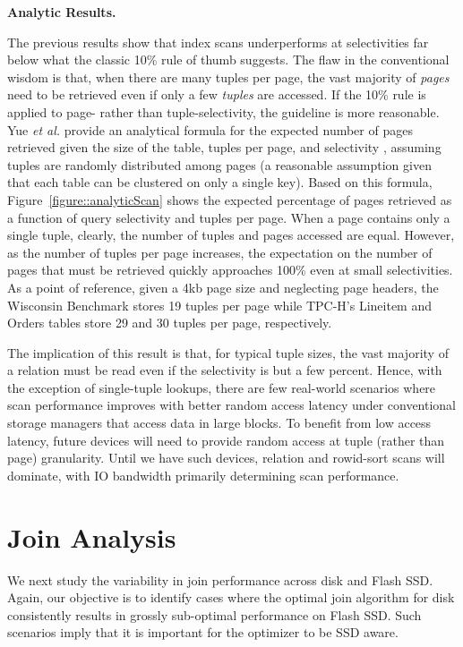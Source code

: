 \textbf{Analytic Results.}

The previous results show that index scans underperforms at selectivities far below what the classic 10\% rule of thumb suggests. 
The flaw in the conventional wisdom is that, when there are many tuples per page, the vast majority of \emph{pages} need to be retrieved even if only a few \emph{tuples} are accessed.
If the 10\% rule is applied to page- rather than tuple-selectivity, the guideline is more reasonable.
Yue \emph{et al.} provide an analytical formula for the expected number of pages retrieved given the size of the table, tuples per page, and selectivity \cite{Yue1975}, assuming tuples are randomly distributed among pages (a reasonable assumption given that each table can be clustered on only a single key).
Based on this formula, Figure~\ref{figure::analyticScan} shows the expected percentage of pages retrieved as a function of query selectivity and tuples per page.
When a page contains only a single tuple, clearly, the number of tuples and pages accessed are equal.
However, as the number of tuples per page increases, the expectation on the number of pages that must be retrieved quickly approaches 100\% even at small selectivities.
As a point of reference, given a 4kb page size and neglecting page headers, the Wisconsin Benchmark stores 19 tuples per page while TPC-H's Lineitem and Orders tables store 29 and 30 tuples per page, respectively.

The implication of this result is that, for typical tuple sizes, the vast majority of a relation must be read even if the selectivity is but a few percent.
Hence, with the exception of single-tuple lookups, there are few real-world scenarios where scan performance improves with better random access latency under conventional storage managers that access data in large blocks.
To benefit from low access latency, future devices will need to provide random access at tuple (rather than page) granularity.
Until we have such devices, relation and rowid-sort scans will dominate, with IO bandwidth primarily determining scan performance.

\section{Join Analysis}
\label{sec:FlashOpti:Joins}





We next study the variability in join performance across disk and Flash SSD.  
Again, our objective is to identify cases where the optimal join algorithm for disk consistently results in grossly sub-optimal performance on Flash SSD.
Such scenarios imply that it is important for the optimizer to be SSD aware.



